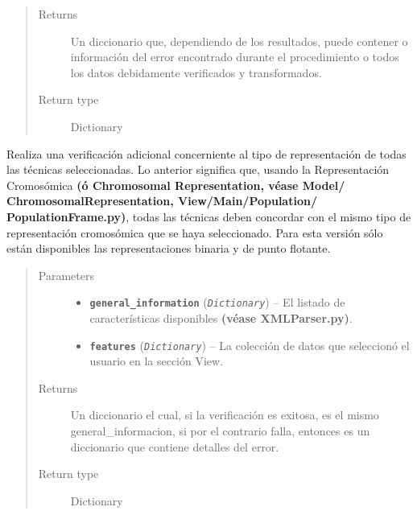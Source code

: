 \documentclass[class=report, crop=false]{standalone}
\begin{document}
\begin{fulllineitems}
\begin{fulllineitems}
\begin{quote}
\begin{description}
\item[{Returns}] \leavevmode
Un diccionario que, dependiendo de los resultados, puede contener
o información del error encontrado durante el procedimiento o 
todos los datos debidamente verificados y transformados.
\item[{Return type}] \leavevmode
Dictionary
\end{description}\end{quote}

\end{fulllineitems}

\begin{fulllineitems}

Realiza una verificación adicional concerniente al tipo \break
de representación de todas las técnicas seleccionadas.\break
Lo anterior significa que, usando la Representación Cromosómica \break
\textbf{(ó Chromosomal Representation, véase Model/}\break
\textbf{ChromosomalRepresentation, View/Main/Population/}\break
\textbf{PopulationFrame.py)}, todas las técnicas deben concordar 
con el mismo tipo de representación cromosómica que se haya 
seleccionado.\break
Para esta versión sólo están disponibles las representaciones binaria 
y de punto flotante.

\begin{quote}\begin{description}
\item[{Parameters}] \leavevmode\begin{itemize}
\item \textbf{\texttt{general\_information}} (\emph{\texttt{Dictionary}}) -- El listado de características disponibles \textbf{(véase XMLParser.py)}.
\item \textbf{\texttt{features}} (\emph{\texttt{Dictionary}}) -- La colección de datos que seleccionó el usuario en la sección View.
\end{itemize}

\item[{Returns}] \leavevmode
Un diccionario el cual, si la verificación es exitosa, es el mismo general\_informacion,
si por el contrario falla, entonces es un diccionario que contiene detalles del error.
\item[{Return type}] \leavevmode
Dictionary
\end{description}\end{quote}


\end{fulllineitems}
\end{fulllineitems}
\end{document}
